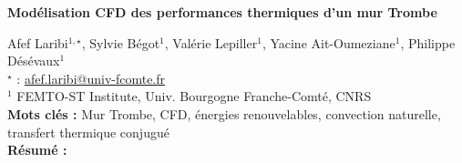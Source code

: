 


    \newpage


%
\begin{flushleft}
\addtocounter{section}{1}
{\Large \textbf{Modélisation CFD des performances thermiques d'un mur Trombe}}\label{ref:55}
\end{flushleft}
%
Afef Laribi$^{1,\star}$, Sylvie Bégot$^{1}$, Valérie Lepiller$^{1}$, Yacine Ait-Oumeziane$^{1}$, Philippe Désévaux$^{1}$\\[2mm]
$^{\star}$ \Letter : \url{afef.laribi@univ-fcomte.fr}\\[2mm]
{\footnotesize $^{1}$ FEMTO-ST Institute, Univ. Bourgogne Franche-Comté, CNRS}\\
[4mm]
%
\noindent \textbf{Mots clés : } Mur Trombe, CFD, énergies renouvelables, convection naturelle, transfert thermique conjugué\\[4mm]
%
\noindent \textbf{Résumé : } 

